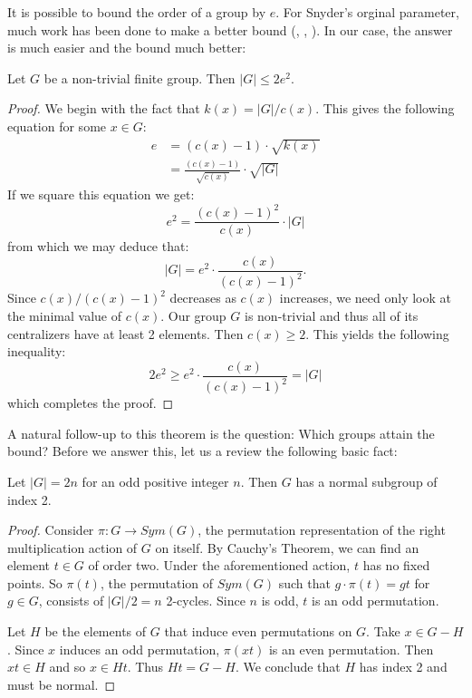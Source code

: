 \documentclass[main.tex]{subfiles}
\begin{document}
\hss

It is possible to bound the order of a group by $e$. For Snyder's orginal parameter, much work has been done to make a better bound (\cite{isaacsarticle}, \cite{durfeejensenarticle}, \cite{lewisarticle}). In our case, the answer is much easier and the bound much better:

\begin{theorem}\label{ebound}
Let $G$ be a non-trivial finite group. Then $|G| \le 2e^2$.
\end{theorem}

\begin{proof}
We begin with the fact that $k(x) = |G|/c(x)$. This gives the following equation for some $x \in G$:
\begin{align*}
e &= (c(x) - 1) \cdot \sqrt{k(x)} \\
&= \frac{(c(x) - 1)}{\sqrt{c(x)}} \cdot \sqrt{|G|}
\end{align*}
If we square this equation we get:
$$e^2 = \frac{(c(x) - 1)^2}{c(x)} \cdot |G|$$
from which we may deduce that:
$$|G| = e^2 \cdot \frac{c(x)}{(c(x) -1)^2}\text{.}$$
Since $c(x)/(c(x) - 1)^2$ decreases as $c(x)$ increases, we need only look at the minimal value of $c(x)$. Our group $G$ is non-trivial and thus all of its centralizers have at least 2 elements. Then $c(x) \ge 2$. This yields the following inequality:
$$2e^2 \ge e^2 \cdot \frac{c(x)}{(c(x) - 1)^2} = |G|$$
which completes the proof.
\end{proof}

A natural follow-up to this theorem is the question: Which groups attain the bound? Before we answer this, let us a review the following basic fact:

\begin{lemma}\label{ordernormal}
Let $|G| = 2n$ for an odd positive integer $n$. Then $G$ has a normal subgroup of index 2. 
\end{lemma}

\begin{proof}
Consider $\pi: G \to Sym(G)$, the permutation representation of the right multiplication action of $G$ on itself. By Cauchy's Theorem, we can find an element $t \in G$ of order two. Under the aforementioned action, $t$ has no fixed points. So $\pi(t)$, the permutation of $Sym(G)$ such that $g \cdot \pi(t) = gt$ for $g \in G$, consists of $|G|/2 = n$ 2-cycles. Since $n$ is odd, $t$ is an odd permutation.

Let $H$ be the elements of $G$ that induce even permutations on $G$. Take $x \in G - H$. Since $x$ induces an odd permutation, $\pi(xt)$ is an even permutation. Then $xt \in H$ and so $x \in Ht$. Thus $Ht = G- H$. We conclude that $H$ has index 2 and must be normal.
\end{proof}
\end{document}
